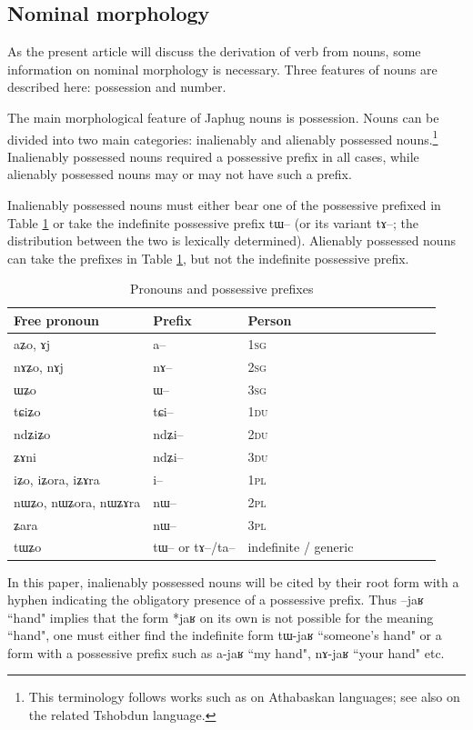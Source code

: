\documentclass[oldfontcommands,oneside,a4paper,11pt]{article}
\newcommand{\ipa}[1]{{\phon \mbox{#1}}} %
\newcommand{\du}{\textsc{du}}
\newcommand{\pl}{\textsc{pl}}
\newcommand{\sg}{\textsc{sg}}
\begin{document}
 
\subsection{Nominal morphology} \label{subsec:nominal}
As the present article will discuss the derivation of verb from nouns, some information on nominal morphology is necessary. Three features of nouns are described here:  possession and number. 


The main morphological feature of Japhug nouns is possession. Nouns can be divided into two main categories: inalienably and alienably possessed nouns.\footnote{This terminology follows works such as \citet{thompson96koyukon}  on Athabaskan languages; see also \citet{jackson98morphology} on the related Tshobdun language.} Inalienably possessed nouns required a possessive prefix in all cases, while alienably possessed nouns may or may not have such a prefix.

Inalienably possessed nouns must either bear one of the possessive prefixed in Table \ref{tab:pronoun} or take the indefinite possessive prefix \ipa{tɯ}-- (or its variant \ipa{tɤ}--; the distribution between the two is lexically determined). Alienably possessed nouns can take the prefixes in Table \ref{tab:pronoun}, but not the indefinite possessive prefix. 



\begin{table}[H] \centering
\caption{Pronouns and possessive prefixes }\label{tab:pronoun}
\begin{tabular}{lllllllll} 
\toprule
 Free pronoun & Prefix & Person\\
\midrule
 \ipa{aʑo},    \ipa{ɤj} &	\ipa{a--}  &		1\sg{} \\
\ipa{nɤʑo},  \ipa{nɤj} &	\ipa{nɤ--}  &			2\sg{} \\
\ipa{ɯʑo}  &	\ipa{ɯ--}  &			3\sg{} \\
\ipa{tɕiʑo}  &	\ipa{tɕi--}  &			1\du{} \\
\ipa{ndʑiʑo}  &	\ipa{ndʑi--}  &		2\du{} \\	
\ipa{ʑɤni}  &	\ipa{ndʑi--}  &		3\du{} \\	
\ipa{iʑo}, \ipa{iʑora},   \ipa{iʑɤra}   &	\ipa{i--}  &			1\pl{} \\
\ipa{nɯʑo}, \ipa{nɯʑora},   \ipa{nɯʑɤra}  &	\ipa{nɯ--}  &			2\pl{} \\
\ipa{ʑara}  &	\ipa{nɯ--}  &			3\pl{} \\
\ipa{tɯʑo} & \ipa{tɯ--} or \ipa{tɤ--}/\ipa{ta--} & indefinite / generic\\
\bottomrule
\end{tabular}
\end{table}
In this paper, inalienably possessed nouns will be cited by their root form with a hyphen indicating the obligatory presence of a possessive prefix. Thus \ipa{--jaʁ} ``hand" implies that the form *\ipa{jaʁ} on its own is not possible for the meaning ``hand", one must either find the indefinite form \ipa{tɯ-jaʁ} ``someone's hand" or a form with a possessive prefix such as \ipa{a-jaʁ} ``my hand", \ipa{nɤ-jaʁ} ``your hand" etc.
\end{document}
